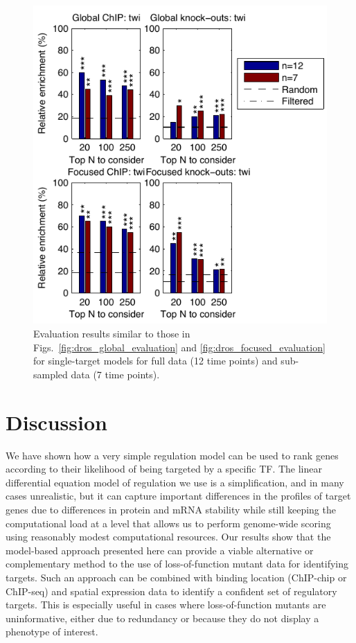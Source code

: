 \documentclass{pnastwo}
\begin{document}
\begin{article}
\begin{figure}[tb]
  \centering
  \includegraphics{dros_data_size_evaluation}
  \caption{Evaluation results similar to those in 
    Figs.~\ref{fig:dros_global_evaluation} and 
    \ref{fig:dros_focused_evaluation} for single-target models
    for full data (12 time points) and sub-sampled data (7 time points).
    \label{fig:dros_data_size_evaluation}
  }
\end{figure}

\section{Discussion}

We have shown how a very simple regulation model can be used to rank
genes according to their likelihood of being targeted by a specific
TF. The linear differential equation model of regulation we use is a simplification, and in
many cases unrealistic, but it can capture important differences in
the profiles of target genes due to differences in protein and mRNA
stability while still keeping the computational load at a level
that allows us to perform genome-wide scoring using reasonably modest
computational resources. Our results show
that the model-based approach presented here can provide a viable alternative or complementary method to the use of
loss-of-function mutant data for identifying targets. Such an approach
can be combined with binding location (ChIP-chip or ChIP-seq)
and spatial expression data to identify a confident set of regulatory
targets. This is especially useful in cases where loss-of-function
mutants are uninformative, either due to redundancy or because they do
not display a phenotype of interest. 


\end{article}
\end{document}
